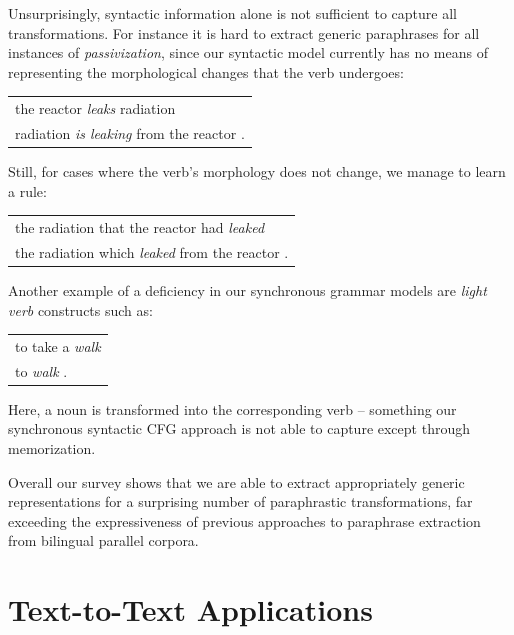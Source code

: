 \documentclass[11pt]{article}
\begin{document}
Unsurprisingly, syntactic information alone is not sufficient to
capture all transformations. For instance it is hard to extract
generic paraphrases for all instances of \emph{passivization}, since
our syntactic model currently has no means of representing the
morphological changes that the verb undergoes:
\begin{center}
\begin{tabular}{l}
  the reactor \emph{leaks} radiation \\
  radiation \emph{is leaking} from the reactor .\\
\end{tabular}
\end{center}
Still, for cases where the verb's morphology does not change, we
manage to learn a rule:
\begin{center}
\begin{tabular}{l}
  the radiation that the reactor had \emph{leaked} \\
  the radiation which \emph{leaked} from the reactor .\\
\end{tabular}
\end{center}
Another example of a deficiency in our synchronous grammar models are
\emph{light verb} constructs such as:
\begin{center}
\begin{tabular}{l}
  to take a \emph{walk} \\
  to \emph{walk} .
\end{tabular}
\end{center}
Here, a noun is transformed into the corresponding verb -- something
our synchronous syntactic CFG approach is not able to capture except
through memorization.

Overall our survey shows that we are able to extract appropriately
generic representations for a surprising number of paraphrastic
transformations, far exceeding the expressiveness of previous
approaches to paraphrase extraction from bilingual parallel corpora.


\section{Text-to-Text Applications} \label{adaptation}
\end{document}
